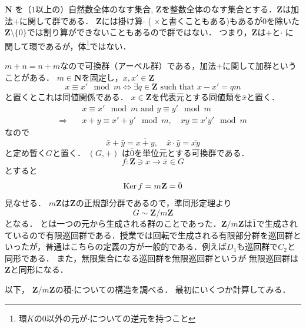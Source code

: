 $\mathbf N$ を（$1$以上の）自然数全体のなす集合, $\mathbf Z$を整数全体のなす集合とする．$\mathbf Z$は加法$+$に関して群である．
$\mathbf Z$には掛け算$\cdot$ ( $\times$と書くこともある)もあるが$0$を除いた$\mathbf Z\setminus\{0\}$では割り算ができないこともあるので群ではない．
つまり，$\mathbf Z$は$+$と$\cdot$ に関して環であるが，体\footnote{環$K$の$0$以外の元が$\cdot$についての逆元を持つこと}ではない．

$m+n=n+m$なので可換群（アーベル群）である，加法$+$に関して加群ということがある．
$m\in \mathbf N$を固定し，$x, x'\in \mathbf Z $
\[
     x\equiv x' \mod m \Leftrightarrow 
     \exists q \in  \mathbf Z \text{ such that }x-x'=qm
\]
と置くとこれは同値関係である．
$x\in \mathbf Z $を代表元とする同値類を$\bar x$と置く．
\[
\begin{split}
     &x\equiv x' \mod m  \text{ and } y\equiv y' \mod m\\
     \Rightarrow \quad
     & x + y \equiv x' + y' \mod m,\quad
     xy\equiv x'y' \mod m
\end{split}
\]
なので
\[
     \bar x + \bar y = \overline{x+y},\quad
     \bar x\cdot \bar y = \overline{xy}
\]
と定め暫く$G$と置く．
$(G, +)$ は$\bar 0$を単位元とする可換群である．
\[
     f:\mathbf Z \ni x \to \bar x \in G
\]
とすると
\[
     \operatorname{Ker} f= m\mathbf Z=\bar 0
\]
見なせる．
$ m\mathbf Z$は$\mathbf Z$の正規部分群であるので，準同形定理より
\[
     G \sim \mathbf Z/m\mathbf Z
\]
となる．
とは一つの元から生成される群のことであった．$\mathbf Z/m\mathbf Z$は$\bar 1$で生成されているので有限巡回群である．授業では回転で生成される有限部分群を巡回群といったが，普通はこちらの定義の方が一般的である．例えば$D_1$も巡回群で$C_2$と同形である．
また，無限集合になる巡回群を無限巡回群というが
無限巡回群は$\mathbf Z$と同形になる．
\emptyline

以下，
$\mathbf Z/m\mathbf Z$の積$\cdot$についての構造を調べる．
最初にいくつか計算してみる．

